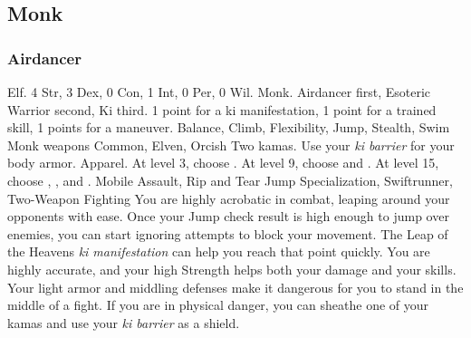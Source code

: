     \subsection{Monk}

        \subsubsection{Airdancer}
             Elf.
             4 Str, 3 Dex, 0 Con, 1 Int, 0 Per, 0 Wil.
             Monk.
             Airdancer first, Esoteric Warrior second, Ki third.
             1 point for a ki manifestation, 1 point for a trained skill, 1 points for a maneuver.
             Balance, Climb, Flexibility, Jump, Stealth, Swim
             Monk weapons
             Common, Elven, Orcish
             Two kamas. Use your \textit{ki barrier} for your body armor.
             Apparel.
                At level 3, choose .
                At level 9, choose  and .
                At level 15, choose , , and .
             Mobile Assault, Rip and Tear
             Jump Specialization, Swiftrunner, Two-Weapon Fighting
             You are highly acrobatic in combat, leaping around your opponents with ease.
            Once your Jump check result is high enough to jump over enemies, you can start ignoring attempts to block your movement.
            The Leap of the Heavens \textit{ki manifestation} can help you reach that point quickly.
            You are highly accurate, and your high Strength helps both your damage and your skills.
            Your light armor and middling defenses make it dangerous for you to stand in the middle of a fight.
            If you are in physical danger, you can sheathe one of your kamas and use your \textit{ki barrier} as a shield.

